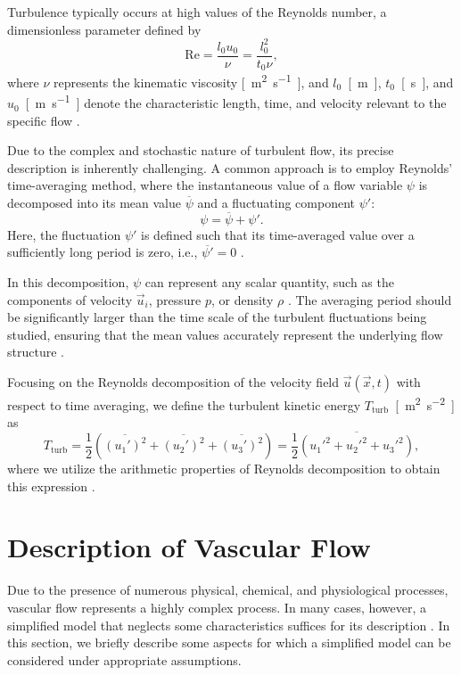 Turbulence typically occurs at high values of the Reynolds number, a dimensionless parameter defined by
\begin{equation}\label{Re}
	\mathrm{Re} = \dfrac{l_{0} u_{0}}{\nu} = \dfrac{l^{2}_{0}}{t_{0} \nu},
\end{equation}
where $ \nu $ represents the kinematic viscosity \si{[m^2.s^{-1}]}, and $ l_{0} $~\si{[m]}, $ t_{0} $~\si{[s]}, and $ u_{0} $~\si{[m.s^{-1}]} denote the characteristic length, time, and velocity relevant to the specific flow \cite{Landau}.

Due to the complex and stochastic nature of turbulent flow, its precise description is inherently challenging. A common approach is to employ Reynolds' time-averaging method, where the instantaneous value of a flow variable $ \psi $ is decomposed into its mean value $ \overline{\psi} $ and a fluctuating component $ \psi' $:
\begin{equation}
	\psi = \overline{\psi} + \psi'.
\end{equation}
Here, the fluctuation $ \psi' $ is defined such that its time-averaged value over a sufficiently long period is zero, i.e., $ \overline{\psi'} = 0 $ \cite{Schlichting}.

In this decomposition, $ \psi $ can represent any scalar quantity, such as the components of velocity $ \vec{u}_i $, pressure $ p $, or density $ \rho $ \cite{Sodja2007}. The averaging period should be significantly larger than the time scale of the turbulent fluctuations being studied, ensuring that the mean values accurately represent the underlying flow structure \cite{Sodja2007}.

Focusing on the Reynolds decomposition of the velocity field $ \vec{u} (\vec{x}, t) $ with respect to time averaging, we define the turbulent kinetic energy $ T_{\text{turb}} $~\si{[m^{2}.s^{-2}]} as
\begin{equation}\label{eq:turb kin energy}
	T_{\text{turb}} = \dfrac{1}{2} \left( \overline{(u_1 ')^2} + \overline{(u_2 ')^2} + \overline{(u_3 ')^2} \right) = \dfrac{1}{2} \overline{ \left( u_1 '^2 + u_2 '^2 + u_3 '^2 \right) },
\end{equation}
where we utilize the arithmetic properties of Reynolds decomposition to obtain this expression \cite{Sodja2007}.

\section{Description of Vascular Flow}\label{cevni proudeni}
Due to the presence of numerous physical, chemical, and physiological processes, vascular flow represents a highly complex process. In many cases, however, a simplified model that neglects some characteristics suffices for its description \cite{Saloner2019}. In this section, we briefly describe some aspects for which a simplified model can be considered under appropriate assumptions.

